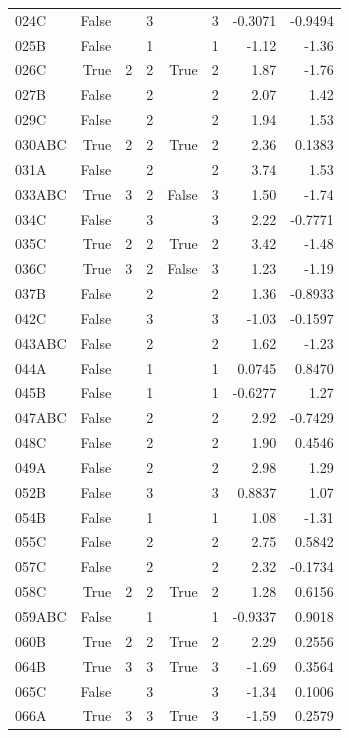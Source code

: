 {\begin{longtable}{lrrrrrrr}
  024C & False &  & 3 &  & 3 & -0.3071 & -0.9494 \\
  025B & False &  & 1 &  & 1 & -1.12 & -1.36 \\
  026C & True & 2 & 2 & True & 2 & 1.87 & -1.76 \\
  027B & False &  & 2 &  & 2 & 2.07 & 1.42 \\
  029C & False &  & 2 &  & 2 & 1.94 & 1.53 \\
  030ABC & True & 2 & 2 & True & 2 & 2.36 & 0.1383 \\
  031A & False &  & 2 &  & 2 & 3.74 & 1.53 \\
  033ABC & True & 3 & 2 & False & 3 & 1.50 & -1.74 \\
  034C & False &  & 3 &  & 3 & 2.22 & -0.7771 \\
  035C & True & 2 & 2 & True & 2 & 3.42 & -1.48 \\
  036C & True & 3 & 2 & False & 3 & 1.23 & -1.19 \\
  037B & False &  & 2 &  & 2 & 1.36 & -0.8933 \\
  042C & False &  & 3 &  & 3 & -1.03 & -0.1597 \\
  043ABC & False &  & 2 &  & 2 & 1.62 & -1.23 \\
  044A & False &  & 1 &  & 1 & 0.0745 & 0.8470 \\
  045B & False &  & 1 &  & 1 & -0.6277 & 1.27 \\
  047ABC & False &  & 2 &  & 2 & 2.92 & -0.7429 \\
  048C & False &  & 2 &  & 2 & 1.90 & 0.4546 \\
  049A & False &  & 2 &  & 2 & 2.98 & 1.29 \\
  052B & False &  & 3 &  & 3 & 0.8837 & 1.07 \\
  054B & False &  & 1 &  & 1 & 1.08 & -1.31 \\
  055C & False &  & 2 &  & 2 & 2.75 & 0.5842 \\
  057C & False &  & 2 &  & 2 & 2.32 & -0.1734 \\
  058C & True & 2 & 2 & True & 2 & 1.28 & 0.6156 \\
  059ABC & False &  & 1 &  & 1 & -0.9337 & 0.9018 \\
  060B & True & 2 & 2 & True & 2 & 2.29 & 0.2556 \\
  064B & True & 3 & 3 & True & 3 & -1.69 & 0.3564 \\
  065C & False &  & 3 &  & 3 & -1.34 & 0.1006 \\
  066A & True & 3 & 3 & True & 3 & -1.59 & 0.2579 \\

\end{longtable}}
